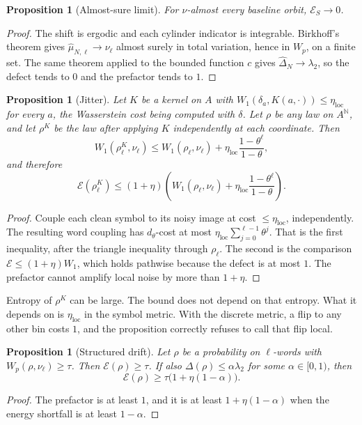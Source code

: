 \documentclass[11pt,reqno]{amsart}
\newtheorem{proposition}[theorem]{Proposition}
\theoremstyle{remark}
\newcommand{\ES}{\mathcal{E}_S}
\newcommand{\loc}{\mathrm{loc}}
\begin{document}
\begin{proposition}[Almost-sure limit]\label{prop:as}
For $\nu$-almost every baseline orbit, $\ES \to 0$.
\end{proposition}
\begin{proof}
The shift is ergodic and each cylinder indicator is integrable. Birkhoff's theorem gives $\hat\mu_{N,\ell} \to \nu_\ell$ almost surely in total variation, hence in $W_p$, on a finite set. The same theorem applied to the bounded function $c$ gives $\hat\Delta_N \to \lambda_2$, so the defect tends to $0$ and the prefactor tends to $1$.
\end{proof}

\begin{proposition}[Jitter]\label{prop:jitter}
Let $K$ be a kernel on $A$ with $W_1(\delta_a, K(a,\cdot)) \le \eta_{\loc}$ for every $a$, the Wasserstein cost being computed with $\delta$. Let $\rho$ be any law on $A^{\mathbb{N}}$, and let $\rho^K$ be the law after applying $K$ independently at each coordinate. Then
\[
W_1(\rho^K_\ell, \nu_\ell)
\le
W_1(\rho_\ell, \nu_\ell) + \eta_{\loc}\frac{1-\theta^\ell}{1-\theta},
\]
and therefore
\[
\mathcal{E}(\rho^K_\ell)
\le
(1+\eta)\left(
W_1(\rho_\ell, \nu_\ell) + \eta_{\loc}\frac{1-\theta^\ell}{1-\theta}
\right).
\]
\end{proposition}
\begin{proof}
Couple each clean symbol to its noisy image at cost $\le \eta_{\loc}$, independently. The resulting word coupling has $d_\theta$-cost at most $\eta_{\loc} \sum_{j=0}^{\ell-1} \theta^j$. That is the first inequality, after the triangle inequality through $\rho_\ell$. The second is the comparison $\mathcal{E} \le (1+\eta) W_1$, which holds pathwise because the defect is at most $1$. The prefactor cannot amplify local noise by more than $1+\eta$.
\end{proof}

Entropy of $\rho^K$ can be large. The bound does not depend on that entropy. What it depends on is $\eta_{\loc}$ in the symbol metric. With the discrete metric, a flip to any other bin costs $1$, and the proposition correctly refuses to call that flip local.

\begin{proposition}[Structured drift]\label{prop:drift}
Let $\rho$ be a probability on $\ell$-words with $W_p(\rho, \nu_\ell) \ge \tau$. Then $\mathcal{E}(\rho) \ge \tau$. If also $\Delta(\rho) \le \alpha \lambda_2$ for some $\alpha \in [0,1)$, then
\[
\mathcal{E}(\rho) \ge \tau \bigl(1 + \eta(1-\alpha)\bigr).
\]
\end{proposition}
\begin{proof}
The prefactor is at least $1$, and it is at least $1+\eta(1-\alpha)$ when the energy shortfall is at least $1-\alpha$.
\end{proof}
\end{document}
